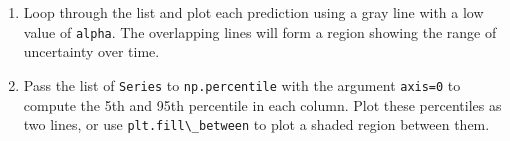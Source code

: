 \begin{enumerate}
\def\labelenumi{\arabic{enumi}.}
\item
  Loop through the list and plot each prediction using a gray line with
  a low value of \passthrough{\lstinline!alpha!}. The overlapping lines
  will form a region showing the range of uncertainty over time.
\item
  Pass the list of \passthrough{\lstinline!Series!} to
  \passthrough{\lstinline!np.percentile!} with the argument
  \passthrough{\lstinline!axis=0!} to compute the 5th and 95th
  percentile in each column. Plot these percentiles as two lines, or use
  \passthrough{\lstinline!plt.fill\_between!} to plot a shaded region
  between them.
\end{enumerate}


